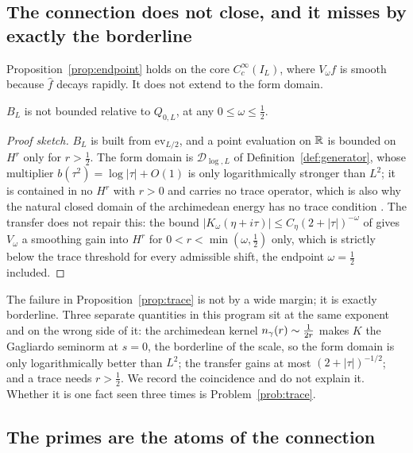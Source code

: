 \subsection{The connection does not close, and it misses by exactly the borderline}

Proposition~\ref{prop:endpoint} holds on the core $C_c^\infty(I_L)$, where
$V_\omega f$ is smooth because $\widehat f$ decays rapidly. It does not extend to
the form domain.

\begin{proposition}\label{prop:trace}
$B_L$ is not bounded relative to $Q_{0,L}$, at any $0\leq\omega\leq\frac12$.
\end{proposition}

\begin{proof}[Proof sketch]
$B_L$ is built from $\mathrm{ev}_{L/2}$, and a point evaluation on $\mathbb R$ is
bounded on $H^r$ only for $r>\frac12$. The form domain is
$\mathcal D_{\log,L}$ of Definition~\ref{def:generator}, whose multiplier
$b(\tau^2)=\log|\tau|+O(1)$ is only logarithmically stronger than $L^2$; it is
contained in no $H^r$ with $r>0$ and carries no trace operator, which is also why
the natural closed domain of the archimedean energy has no trace condition
\cite{InverseBulk}. The transfer does not repair this: the bound
$|K_\omega(\eta+i\tau)|\leq C_\eta(2+|\tau|)^{-\omega}$ of \cite{Background}
gives $V_\omega$ a smoothing gain into $H^r$ for $0<r<\min(\omega,\frac12)$ only,
which is strictly below the trace threshold for every admissible shift, the
endpoint $\omega=\frac12$ included.
\end{proof}

\begin{remark}\label{rem:marginal}
The failure in Proposition~\ref{prop:trace} is not by a wide margin; it is
exactly borderline. Three separate quantities in this program sit at the same
exponent and on the wrong side of it: the archimedean kernel
$n_{\gamma}(r)\sim\frac1{2r}$ makes $K$ the Gagliardo seminorm at $s=0$, the
borderline of the scale, so the form domain is only logarithmically better than
$L^2$; the transfer gains at most $(2+|\tau|)^{-1/2}$; and a trace needs
$r>\frac12$. We record the coincidence and do not explain it. Whether it is one
fact seen three times is Problem~\ref{prob:trace}.
\end{remark}

\subsection{The primes are the atoms of the connection}\label{subsec:atoms}

